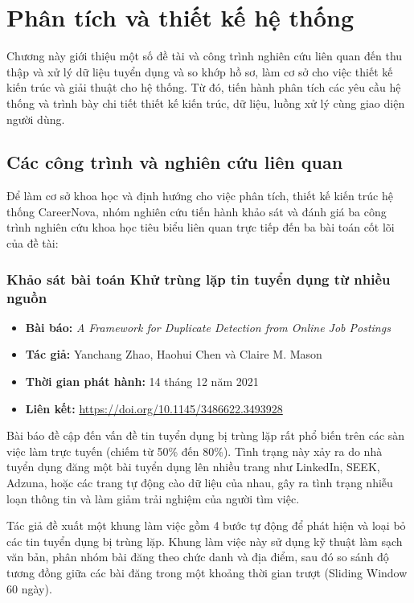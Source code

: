 \chapter{Phân tích và thiết kế hệ thống}
\label{Chapter3}

Chương này giới thiệu một số đề tài và công trình nghiên cứu liên quan đến thu thập và xử lý dữ liệu tuyển dụng và so khớp hồ sơ, làm cơ sở cho việc thiết kế kiến trúc và giải thuật cho hệ thống. Từ đó, tiến hành phân tích các yêu cầu hệ thống và trình bày chi tiết thiết kế kiến trúc, dữ liệu, luồng xử lý cùng giao diện người dùng.

\section{Các công trình và nghiên cứu liên quan}
\label{sec:related_works}

Để làm cơ sở khoa học và định hướng cho việc phân tích, thiết kế kiến trúc hệ thống CareerNova, nhóm nghiên cứu tiến hành khảo sát và đánh giá ba công trình nghiên cứu khoa học tiêu biểu liên quan trực tiếp đến ba bài toán cốt lõi của đề tài:

\subsection{Khảo sát bài toán Khử trùng lặp tin tuyển dụng từ nhiều nguồn}
\begin{itemize}
    \item \textbf{Bài báo:} \textit{A Framework for Duplicate Detection from Online Job Postings}
    \item \textbf{Tác giả:} Yanchang Zhao, Haohui Chen và Claire M. Mason
    \item \textbf{Thời gian phát hành:} 14 tháng 12 năm 2021
    \item \textbf{Liên kết:} \url{https://doi.org/10.1145/3486622.3493928}
\end{itemize}

Bài báo đề cập đến vấn đề tin tuyển dụng bị trùng lặp rất phổ biến trên các sàn việc làm trực tuyến (chiếm từ 50\% đến 80\%). Tình trạng này xảy ra do nhà tuyển dụng đăng một bài tuyển dụng lên nhiều trang như LinkedIn, SEEK, Adzuna, hoặc các trang tự động cào dữ liệu của nhau, gây ra tình trạng nhiễu loạn thông tin và làm giảm trải nghiệm của người tìm việc.

Tác giả đề xuất một khung làm việc gồm 4 bước tự động để phát hiện và loại bỏ các tin tuyển dụng bị trùng lặp. Khung làm việc này sử dụng kỹ thuật làm sạch văn bản, phân nhóm bài đăng theo chức danh và địa điểm, sau đó so sánh độ tương đồng giữa các bài đăng trong một khoảng thời gian trượt (Sliding Window 60 ngày).

